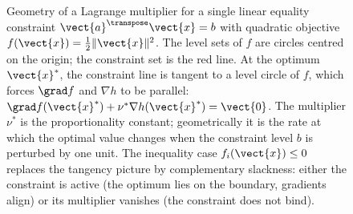 \begin{figure}[ht]
\centering
{}
\caption[Lagrange-multiplier geometry for an equality
constraint]{Geometry of a Lagrange multiplier for a single linear
equality constraint $\vect{a}^{\transpose} \vect{x} = b$ with
quadratic objective $f(\vect{x}) = \tfrac{1}{2}\|\vect{x}\|^{2}$.
The level sets of $f$ are circles centred on the origin; the
constraint set is the red line. At the optimum $\vect{x}^{*}$, the
constraint line is tangent to a level circle of $f$, which forces
$\grad f$ and $\nabla h$ to be parallel: $\grad f(\vect{x}^{*}) +
\nu^{*} \nabla h(\vect{x}^{*}) = \vect{0}$. The multiplier
$\nu^{*}$ is the proportionality constant; geometrically it is the
rate at which the optimal value changes when the constraint level
$b$ is perturbed by one unit. The inequality case
$f_{i}(\vect{x}) \leq 0$ replaces the tangency picture by
complementary slackness: either the constraint is active (the
optimum lies on the boundary, gradients align) or its multiplier
vanishes (the constraint does not bind).}
\label{fig:vol02:ch15:lagrange-geometry}
\end{figure}
